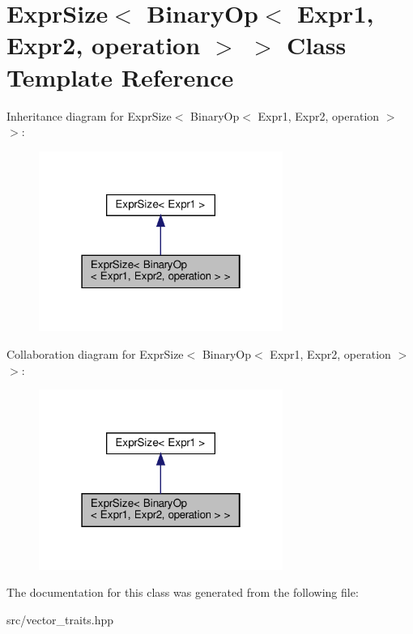 \hypertarget{classExprSize_3_01BinaryOp_3_01Expr1_00_01Expr2_00_01operation_01_4_01_4}{}\section{Expr\+Size$<$ Binary\+Op$<$ Expr1, Expr2, operation $>$ $>$ Class Template Reference}
\label{classExprSize_3_01BinaryOp_3_01Expr1_00_01Expr2_00_01operation_01_4_01_4}


Inheritance diagram for Expr\+Size$<$ Binary\+Op$<$ Expr1, Expr2, operation $>$ $>$\+:
\nopagebreak
\begin{figure}[H]
\begin{center}
\leavevmode
\includegraphics[width=226pt]{classExprSize_3_01BinaryOp_3_01Expr1_00_01Expr2_00_01operation_01_4_01_4__inherit__graph}
\end{center}
\end{figure}


Collaboration diagram for Expr\+Size$<$ Binary\+Op$<$ Expr1, Expr2, operation $>$ $>$\+:
\nopagebreak
\begin{figure}[H]
\begin{center}
\leavevmode
\includegraphics[width=226pt]{classExprSize_3_01BinaryOp_3_01Expr1_00_01Expr2_00_01operation_01_4_01_4__coll__graph}
\end{center}
\end{figure}


The documentation for this class was generated from the following file\+:\begin{DoxyCompactItemize}
\item 
src/vector\+\_\+traits.\+hpp\end{DoxyCompactItemize}

